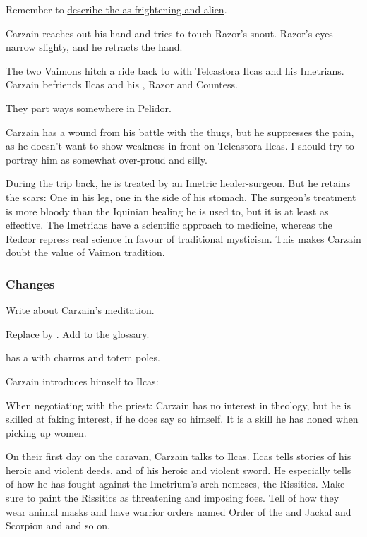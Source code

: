 \begin{garbage}
Remember to \hyperref[Nycans are frightening]{describe the \nycans{} as frightening and alien}.

Carzain reaches out his hand and tries to touch Razor's snout. Razor's eyes narrow slighty, and he retracts the hand. 

The two Vaimons hitch a ride back to \Redglen{} with Telcastora Ilcas and his Imetrians. Carzain befriends Ilcas and his \nycans, Razor and Countess. 

They part ways somewhere in Pelidor. 

Carzain has a wound from his battle with the thugs, but he suppresses the pain, as he doesn't want to show weakness in front on Telcastora Ilcas. I should try to portray him as somewhat over-proud and silly. 

During the trip back, he is treated by an Imetric healer-surgeon. But he retains the scars: One in his leg, one in the side of his stomach. 
The surgeon's treatment is more bloody than the Iquinian healing he is used to, but it is at least as effective. The Imetrians have a scientific approach to medicine, whereas the Redcor repress real science in favour of traditional mysticism. 
This makes Carzain doubt the value of Vaimon tradition.





\subsubsection{Changes}
Write about Carzain's meditation. 

Replace  by \quo{\shechinah}.
Add \quo{\shechinah} to the glossary. 

\Bryndwin{} has a  with charms and totem poles. 

Carzain introduces himself to Ilcas: 

When negotiating with the priest: 
Carzain has no interest in theology, but he is skilled at faking interest, if he does say so himself. 
It is a skill he has honed when picking up women. 

On their first day on the caravan, Carzain talks to Ilcas. 
Ilcas tells stories of his heroic and violent deeds, and of his heroic and violent sword. 
He especially tells of how he has fought against the Imetrium's arch-nemeses, the Rissitics. 
Make sure to paint the Rissitics as threatening and imposing foes.
Tell of how they wear animal masks and have warrior orders named Order of the  and Jackal and Scorpion and  and so on. 


\end{garbage}
